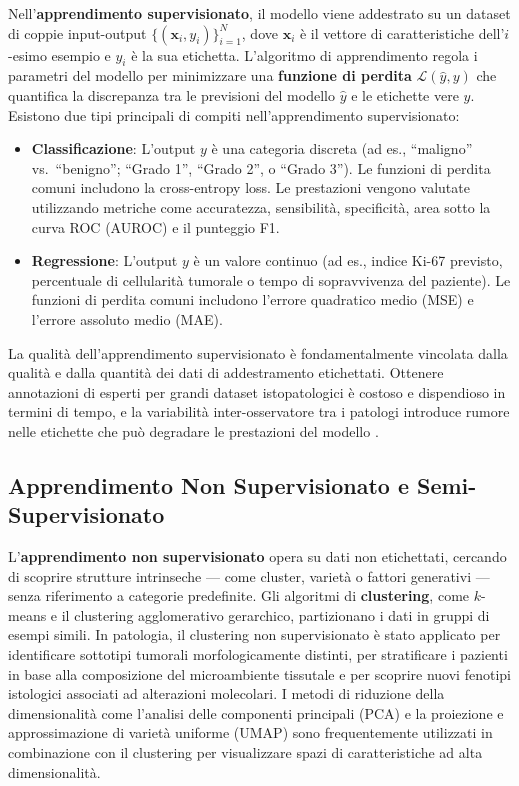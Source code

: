 Nell'\textbf{apprendimento supervisionato}, il modello viene addestrato su un dataset di coppie input-output $\{(\mathbf{x}_i, y_i)\}_{i=1}^{N}$, dove $\mathbf{x}_i$ è il vettore di caratteristiche dell'$i$-esimo esempio e $y_i$ è la sua etichetta. L'algoritmo di apprendimento regola i parametri del modello per minimizzare una \textbf{funzione di perdita} $\mathcal{L}(\hat{y}, y)$ che quantifica la discrepanza tra le previsioni del modello $\hat{y}$ e le etichette vere $y$. Esistono due tipi principali di compiti nell'apprendimento supervisionato:

\begin{itemize}
    \item \textbf{Classificazione}: L'output $y$ è una categoria discreta (ad es., ``maligno'' vs.\ ``benigno''; ``Grado 1'', ``Grado 2'', o ``Grado 3''). Le funzioni di perdita comuni includono la cross-entropy loss. Le prestazioni vengono valutate utilizzando metriche come accuratezza, sensibilità, specificità, area sotto la curva ROC (AUROC) e il punteggio F1.

    \item \textbf{Regressione}: L'output $y$ è un valore continuo (ad es., indice Ki-67 previsto, percentuale di cellularità tumorale o tempo di sopravvivenza del paziente). Le funzioni di perdita comuni includono l'errore quadratico medio (MSE) e l'errore assoluto medio (MAE).
\end{itemize}

La qualità dell'apprendimento supervisionato è fondamentalmente vincolata dalla qualità e dalla quantità dei dati di addestramento etichettati. Ottenere annotazioni di esperti per grandi dataset istopatologici è costoso e dispendioso in termini di tempo, e la variabilità inter-osservatore tra i patologi introduce rumore nelle etichette che può degradare le prestazioni del modello \cite{bera2019}.

\subsection{Apprendimento Non Supervisionato e Semi-Supervisionato}

L'\textbf{apprendimento non supervisionato} opera su dati non etichettati, cercando di scoprire strutture intrinseche — come cluster, varietà o fattori generativi — senza riferimento a categorie predefinite. Gli algoritmi di \textbf{clustering}, come $k$-means e il clustering agglomerativo gerarchico, partizionano i dati in gruppi di esempi simili. In patologia, il clustering non supervisionato è stato applicato per identificare sottotipi tumorali morfologicamente distinti, per stratificare i pazienti in base alla composizione del microambiente tissutale e per scoprire nuovi fenotipi istologici associati ad alterazioni molecolari. I metodi di riduzione della dimensionalità come l'analisi delle componenti principali (PCA) e la proiezione e approssimazione di varietà uniforme (UMAP) sono frequentemente utilizzati in combinazione con il clustering per visualizzare spazi di caratteristiche ad alta dimensionalità.

